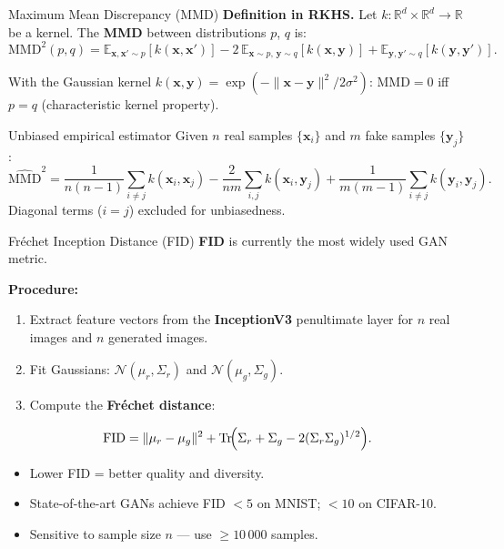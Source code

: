\documentclass[aspectratio=169,11pt]{beamer}
\newcommand{\E}{\mathbb{E}}
\newcommand{\R}{\mathbb{R}}
\newcommand{\bx}{\bm{x}}
\begin{document}
\begin{frame}{Maximum Mean Discrepancy (MMD)}
  \textbf{Definition in RKHS.}  Let $k:\R^d\times\R^d\to\R$ be a kernel.
  The \textbf{MMD} between distributions $p$, $q$ is:
  \[
    \mathrm{MMD}^2(p,q)
    = \E_{\bx,\bx'\sim p}[k(\bx,\bx')]
    - 2\,\E_{\bx\sim p,\,\mathbf{y}\sim q}[k(\bx,\mathbf{y})]
    + \E_{\mathbf{y},\mathbf{y}'\sim q}[k(\mathbf{y},\mathbf{y}')].
  \]

  With the Gaussian kernel $k(\bx,\mathbf{y})=\exp(-\|\bx-\mathbf{y}\|^2/2\sigma^2)$:
  $\mathrm{MMD}=0$ iff $p=q$ (characteristic kernel property).

  \begin{block}{Unbiased empirical estimator}
    Given $n$ real samples $\{\bx_i\}$ and $m$ fake samples $\{\mathbf{y}_j\}$:
    \[
      \widehat{\mathrm{MMD}}^2
      = \frac{1}{n(n-1)}\!\sum_{i\ne j}\!k(\bx_i,\bx_j)
      - \frac{2}{nm}\sum_{i,j}\!k(\bx_i,\mathbf{y}_j)
      + \frac{1}{m(m-1)}\!\sum_{i\ne j}\!k(\mathbf{y}_i,\mathbf{y}_j).
    \]
    Diagonal terms ($i=j$) excluded for unbiasedness.
  \end{block}
\end{frame}

\begin{frame}{Fr\'echet Inception Distance (FID)}
  \textbf{FID} is currently the most widely used GAN metric.

  \medskip
  \textbf{Procedure:}
  \begin{enumerate}
    \item Extract feature vectors from the \textbf{InceptionV3} penultimate layer
          for $n$ real images and $n$ generated images.
    \item Fit Gaussians: $\mathcal{N}(\mu_r, \Sigma_r)$ and $\mathcal{N}(\mu_g, \Sigma_g)$.
    \item Compute the \textbf{Fr\'echet distance}:
  \end{enumerate}
  \[
    \mathrm{FID}
    = \|\mu_r - \mu_g\|^2
      + \mathrm{Tr}\!\Bigl(
          \Sigma_r + \Sigma_g
          - 2(\Sigma_r\Sigma_g)^{1/2}
        \Bigr).
  \]

  \begin{itemize}
    \item Lower FID = better quality and diversity.
    \item State-of-the-art GANs achieve FID $<5$ on MNIST; $<10$ on CIFAR-10.
    \item Sensitive to sample size $n$ — use $\ge 10\,000$ samples.
  \end{itemize}
\end{frame}
\end{document}
